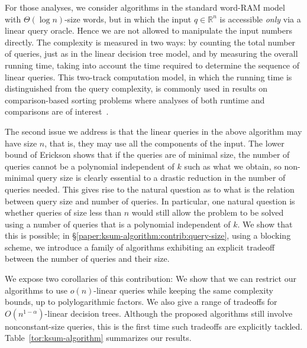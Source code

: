 For those analyses, we consider algorithms in the standard word-RAM model with
$\Theta(\log n)$-size words, but in which the input $q\in\mathbb{R}^n$ is
accessible \emph{only} via a linear query oracle. Hence we are not allowed to
manipulate the input numbers directly. The complexity is measured in two ways:
by counting the total number of queries, just as in the linear decision tree
model, and by measuring the overall running time, taking into account the time
required to determine the sequence of linear queries. This two-track
computation model, in which the running time is distinguished from the query
complexity, is commonly used in results on comparison-based sorting problems
where analyses of both runtime and comparisons are of
interest~\cite{SS95,CFJJM10,CFJJM13}.

The second issue we address is that the linear queries in the above algorithm may
have size $n$, that is, they may use all the components of the input.
The lower bound of Erickson shows that if the queries are of minimal size, the number
of queries cannot be a polynomial independent of $k$ such as what we obtain, so
non-minimal query size is clearly essential to a drastic reduction in the number of queries needed.
This gives rise to the natural question as to what is the relation between query size and number of queries.
In particular, one natural question is whether queries of size less than $n$
would still allow the problem to be solved using a number of queries that is a
polynomial independent of $k$. We show that this is possible; in
\S\ref{paper:ksum-algorithm:contrib:query-size},
using a blocking scheme,
we introduce a family of
algorithms exhibiting an explicit tradeoff between the number of queries and
their size.
%


We expose two corollaries of this contribution:
%
We show that we can restrict our algorithms to
use $o(n)$-linear queries while keeping the same complexity bounds, up to
polylogarithmic factors.
%
We also give a range of tradeoffs for $O(n^{1-\alpha})$-linear decision trees.
%
Although the proposed algorithms still involve nonconstant-size queries, this
is the first time such tradeoffs are explicitly tackled.
%
Table~\ref{tor:ksum-algorithm} summarizes our results.

